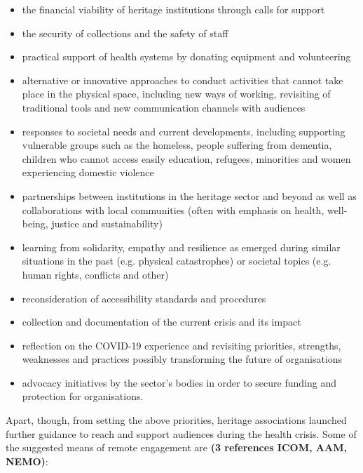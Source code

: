 \documentclass{egpubl}
\begin{document}
\begin{itemize}
\item the financial viability of heritage institutions through calls for support
\item the security of collections and the safety of staff
\item practical support of health systems by donating equipment and volunteering 
\item alternative or innovative approaches to conduct activities that cannot take place in the physical space, including new ways of working, revisiting of traditional tools and new communication channels with audiences
\item responses to societal needs and current developments, including supporting vulnerable groups such as the homeless, people suffering from dementia, children who cannot access easily education, refugees, minorities and women experiencing domestic violence
\item partnerships between institutions in the heritage sector and beyond as well as collaborations with local communities (often with emphasis on health, well-being, justice and sustainability)
\item learning from solidarity, empathy and resilience as emerged during similar situations in the past (e.g. physical catastrophes) or societal topics (e.g. human rights, conflicts and other)
\item reconsideration of accessibility standards and procedures
\item collection and documentation of the current crisis and its impact
\item reflection on the COVID-19 experience and revisiting priorities, strengths, weaknesses and practices possibly transforming the future of organisations
\item advocacy initiatives by the sector's bodies in order to secure funding and protection for organisations.
\end{itemize}

Apart, though, from setting the above priorities, heritage associations launched further guidance to reach and support audiences during the health crisis. Some of the suggested means of remote engagement are \textbf{(3 references ICOM, AAM, NEMO)}:
\end{document}
